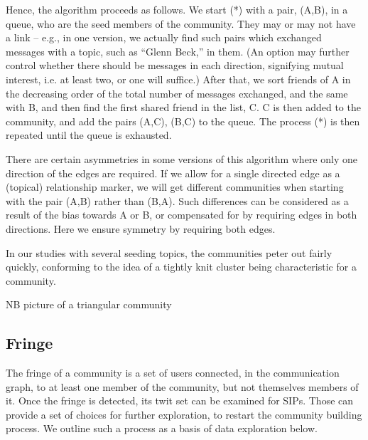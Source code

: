 Hence, the algorithm proceeds as follows.  We start (*) with a pair, (A,B), in a queue, who are the seed members of the community.  They may or may not have a link -- e.g., in one version, we actually find such pairs which exchanged messages with a topic, such as ``Glenn Beck,'' in them.  (An option may further control whether there should be messages in each direction, signifying mutual interest, i.e. at least two, or one will suffice.)  After that, we sort friends of A in the decreasing order of the total number of messages exchanged, and the same with B, and then find the first shared friend in the list, C.  C is then added to the community, and add the pairs (A,C), (B,C) to the queue.  The process (*) is then repeated until the queue is exhausted.

There are certain asymmetries in some versions of this algorithm where only one direction of the edges are required.  If we allow for a single directed edge as a (topical) relationship marker, we will get different communities when starting with the pair (A,B) rather than (B,A).  Such differences can be considered as a result of the bias towards A or B, or compensated for by requiring edges in both directions.  Here we ensure symmetry by requiring both edges.

In our studies with several seeding topics, the communities peter out fairly quickly, conforming to the idea of a tightly knit cluster \cite{Tarjan08} being characteristic for a community.

NB picture of a triangular community

\subsection{Fringe}

The fringe of a community is a set of users connected, in the communication graph, to at least one member of the community, but not themselves members of it.  Once the fringe is detected, its twit set can be examined for SIPs.  Those can provide a set of choices for further exploration, to restart the community building process.  We outline such a process as a basis of data exploration below.